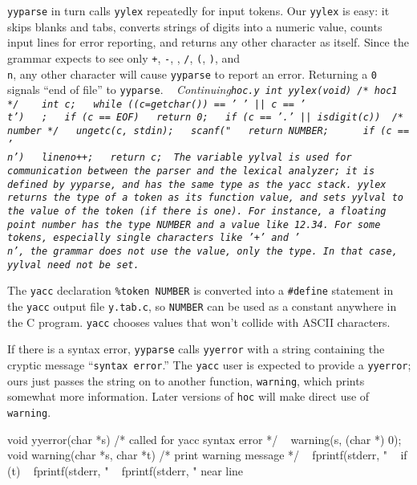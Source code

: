 {{\tt yyparse} in turn calls {\tt yylex} repeatedly for input
tokens. Our {\tt yylex} is easy: it skips blanks and tabs,
converts strings of digits into a numeric value, counts input
lines for error reporting, and returns any other character as
itself.
Since the grammar expects to see only {\tt+}, {\tt-}, {\tt*},
{\tt/}, {\tt(}, {\tt)}, and {\tt\\n}, any other character
will cause {\tt yyparse} to report an error. Returning a {\tt0}
signals ``end of file'' to {\tt yyparse}.
\medskip
\begincode
~                       \it Continuing\/\tt hoc.y
int yylex(void)          /* hoc1 */
{
~       int c;
\smallskip
~       while ((c=getchar()) == ' ' || c == '\\t')
~               ;
~       if (c == EOF)
~               return 0;
~       if (c == '.' || isdigit(c)) {   /* number */
~               ungetc(c, stdin);
~               scanf("%
~               return NUMBER;
~       }
~       if (c == '\\n')
~               lineno++;
~       return c;
}
\endcode
\medskip
\noindent
The variable {\tt yylval} is used for communication between
the parser and the lexical analyzer; it is defined by {\tt yyparse},
and has the same type as the {\tt yacc} stack. {\tt yylex} returns
the {\it type\/} of a token as its function value, and sets
{\tt yylval} to the {\it value\/} of the token (if there is one).
For instance, a floating point number has the type {\tt NUMBER}
and a value like 12.34. For some tokens, especially single
characters like {\tt'+'} and {\tt'\\n'}, the grammar does not use
the value, only the type. In that case, {\tt yylval} need not be set.

The {\tt yacc} declaration {\tt\%token NUMBER} is converted into
a {\tt\#define} statement in the {\tt yacc} output file {\tt y.tab.c},
so {\tt NUMBER} can be used as a constant anywhere in the C program.
{\tt yacc} chooses values that won't collide with {\sc ASCII} characters.

If there is a syntax error, {\tt yyparse} calls {\tt yyerror} with
a string containing the cryptic message ``{\tt syntax error}.''
The {\tt yacc} user is expected to provide a {\tt yyerror}; ours
just passes the string on to another function, {\tt warning},
which prints somewhat more information. Later versions of {\tt hoc}
will make direct use of {\tt warning}.

\medskip
\begincode
void yyerror(char *s)  /* called for yacc syntax error */
{
~       warning(s, (char *) 0);
}
\medbreak
void warning(char *s, char *t)  /* print warning message */
{
~       fprintf(stderr, "%
~       if (t)
~               fprintf(stderr, " %
~       fprintf(stderr, " near line %
}
\endcode
\medskip

}
